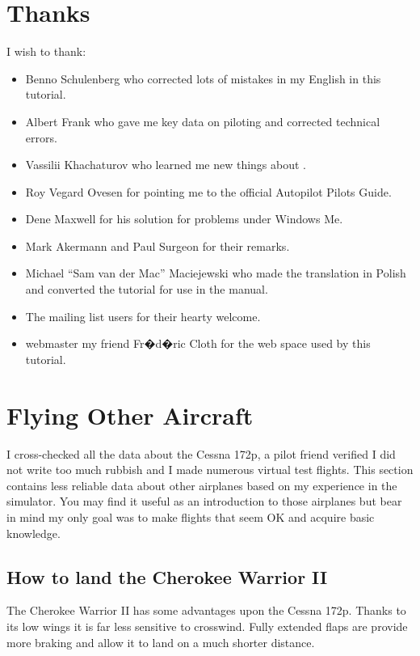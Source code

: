 \begin{itemize}
\section{Thanks}

I wish to thank:
\begin{itemize}
    \item Benno Schulenberg who corrected lots of mistakes in my English in this
  tutorial.
    \item Albert Frank who gave me key data on piloting and corrected technical
  errors.
    \item Vassilii Khachaturov who learned me new things about \FlightGear.
    \item Roy Vegard Ovesen for pointing me to the official Autopilot Pilots Guide.
    \item Dene Maxwell for his solution for problems under Windows Me.
    \item Mark Akermann and Paul Surgeon for their remarks.
    \item Michael ``Sam van der Mac'' Maciejewski who made the translation in
  Polish and converted the tutorial for use in the manual.
    \item The \FlightGear{} mailing list users for their hearty welcome.
  \item {} webmaster my friend Fr�d�ric Cloth for
  the web space used by this tutorial.
\end{itemize}

\section{Flying Other Aircraft}

I cross-checked all the data about the Cessna 172p, a pilot friend verified I
did not write too much rubbish and I made numerous virtual test flights. This
section contains less reliable data about other airplanes based on my experience
in the simulator. You may find it useful as an introduction to those airplanes
but bear in mind my only goal was to make flights that seem OK and acquire basic
knowledge.

\subsection{How to land the Cherokee Warrior II}
\label{sec:Cherokee}

The Cherokee Warrior II has some advantages upon the Cessna 172p. Thanks to its
low wings it is far less sensitive to crosswind. Fully extended flaps are provide
more braking and allow it to land on a much shorter distance.


\end{itemize}
